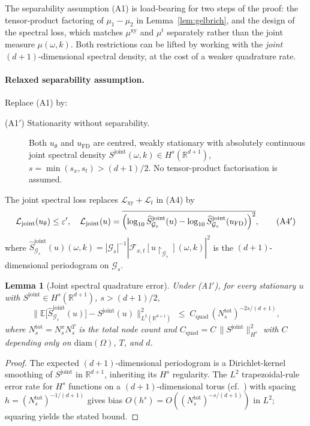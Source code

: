 \documentclass[review,12pt]{elsarticle}
\newtheorem{lemma}{Lemma}
\begin{document}
The separability assumption (A1) is load-bearing for two steps of the
proof: the tensor-product factoring of \(\mu_1 - \mu_2\) in
Lemma~\ref{lem:gelbrich}, and the design of the spectral loss, which
matches \(\mu^{\mathrm{xy}}\) and \(\mu^t\) separately rather than
the joint measure \(\mu(\omega, k)\). Both restrictions can be lifted
by working with the \emph{joint} \((d+1)\)-dimensional spectral
density, at the cost of a weaker quadrature rate.

\paragraph{Relaxed separability assumption.}
Replace (A1) by:
\begin{description}
\item[(A1$'$) Stationarity without separability.]
Both \(u_\theta\) and \(u_{\mathrm{FD}}\) are centred, weakly
stationary with absolutely continuous joint spectral density
\(S^{\mathrm{joint}}(\omega, k) \in H^s(\mathbb R^{d+1})\),
\(s = \min(s_x, s_t) > (d+1)/2\). No tensor-product factorisation
is assumed.
\end{description}

The joint spectral loss replaces
\(\mathcal L_{\mathrm{xy}} + \mathcal L_t\) in (A4) by
\begin{equation}
\label{eq:joint-tolerance}
\mathcal L_{\mathrm{joint}}(u_\theta) \le \varepsilon', \quad
\mathcal L_{\mathrm{joint}}(u) =
\overline{\Bigl(
\log_{10}\widehat S^{\mathrm{joint}}_{\mathcal G_s}(u)
- \log_{10}\widehat S^{\mathrm{joint}}_{\mathcal G_s}(u_{\mathrm{FD}})
\Bigr)^2},
\tag{A4$'$}
\end{equation}
where
\(\widehat S^{\mathrm{joint}}_{\mathcal G_s}(u)(\omega, k) =
|\mathcal G_s|^{-1}
|\mathcal F_{x,t}[u\!\upharpoonright_{\mathcal G_s}](\omega,k)|^2\)
is the \((d+1)\)-dimensional periodogram on \(\mathcal G_s\).

\begin{lemma}[Joint spectral quadrature error]
\label{lem:joint-quadrature}
Under (A1$'$), for every stationary \(u\) with
\(S^{\mathrm{joint}} \in H^s(\mathbb R^{d+1})\), \(s > (d+1)/2\),
\[
\bigl\|\mathbb E\bigl[\widehat S^{\mathrm{joint}}_{\mathcal G_s}(u)\bigr]
- S^{\mathrm{joint}}(u)\bigr\|^2_{L^2(\mathbb R^{d+1})}
\;\le\; C_{\mathrm{quad}}\,(N_s^{\mathrm{tot}})^{-2s/(d+1)},
\]
where \(N_s^{\mathrm{tot}} = N_s^x N_s^T\) is the total node count
and \(C_{\mathrm{quad}} = C\,\|S^{\mathrm{joint}}\|^2_{H^s}\) with
\(C\) depending only on \(\mathrm{diam}(\Omega)\), \(T\), and \(d\).
\end{lemma}
\begin{proof}
The expected \((d+1)\)-dimensional periodogram is a Dirichlet-kernel
smoothing of \(S^{\mathrm{joint}}\) in \(\mathbb R^{d+1}\), inheriting
its \(H^s\) regularity. The \(L^2\) trapezoidal-rule error rate for
\(H^s\) functions on a \((d+1)\)-dimensional torus
(cf.~\cite{Brillinger1981,Trefethen2000}) with spacing
\(h = (N_s^{\mathrm{tot}})^{-1/(d+1)}\) gives bias
\(O(h^s) = O((N_s^{\mathrm{tot}})^{-s/(d+1)})\) in \(L^2\); squaring
yields the stated bound.
\end{proof}
\end{document}

